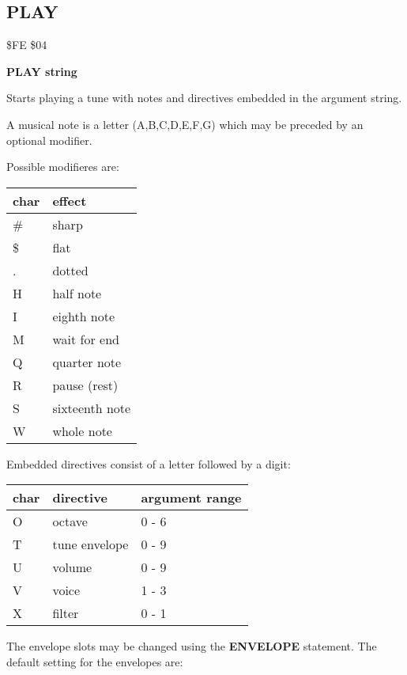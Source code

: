 \subsection{PLAY}
\begin{description}[leftmargin=3cm,style=nextline]
\item [Token:] \$FE \$04
\item [Format:] {\bf PLAY string}
\item [Usage:] Starts playing a tune with notes and directives
               embedded in the argument string.

               A musical note is a letter (A,B,C,D,E,F,G)
               which may be preceded by an optional modifier.

               Possible modifieres are:

\ttfamily
{\setlength{\tabcolsep}{1mm}
\begin{tabular}{*{1}{|R{9mm}}|l|}
\hline
 char  & effect \\
\hline
 \# & sharp \\
 \$ & flat \\
  . & dotted \\
  H & half note \\
  I & eighth note \\
  M & wait for end \\
  Q & quarter note \\
  R & pause (rest) \\
  S & sixteenth note \\
  W & whole note \\
\hline
\end{tabular}
}

              Embedded directives consist of
         a letter followed by a digit:

\ttfamily
{\setlength{\tabcolsep}{1mm}
\begin{tabular}{*{1}{|R{9mm}}|l|l|}
\hline
 char  & directive & argument range \\
\hline
  O & octave        & 0 - 6 \\
  T & tune envelope & 0 - 9 \\
  U & volume        & 0 - 9 \\
  V & voice         & 1 - 3 \\
  X & filter        & 0 - 1 \\
\hline
\end{tabular}
}

The envelope slots may be changed using the {\bf ENVELOPE}
statement. The default setting for the envelopes are:


\end{description}

